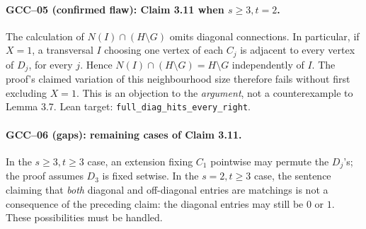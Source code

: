 \documentclass[11pt,a4paper]{article}
\begin{document}
\paragraph{GCC--05 (confirmed flaw): Claim 3.11 when \(s\geq3,t=2\).}
The calculation of \(N(I)\cap(H\setminus G)\) omits diagonal
connections. In particular, if \(X=1\), a transversal \(I\)
choosing one vertex of each \(C_j\) is adjacent to every vertex
of \(D_j\), for every \(j\). Hence
\(N(I)\cap(H\setminus G)=H\setminus G\) independently of \(I\).
The proof's claimed variation of this neighbourhood size therefore
fails without first excluding \(X=1\). This is an objection to
the \emph{argument}, not a counterexample to Lemma 3.7.
Lean target: \texttt{full\_diag\_hits\_every\_right}.

\paragraph{GCC--06 (gaps): remaining cases of Claim 3.11.}
In the \(s\geq3,t\geq3\) case, an extension fixing \(C_1\)
pointwise may permute the \(D_j\)'s; the proof assumes \(D_3\)
is fixed setwise. In the \(s=2,t\geq3\) case, the sentence
claiming that \emph{both} diagonal and off-diagonal entries
are matchings is not a consequence of the preceding claim:
the diagonal entries may still be \(0\) or \(1\).
These possibilities must be handled.
\end{document}
